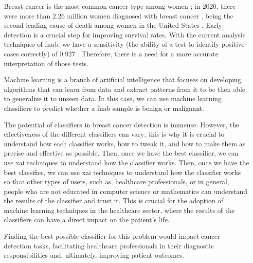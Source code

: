 
Breast cancer is the most common cancer type among women \cite{wcrf_international_breast_nodate}; in 2020, there were more than 2.26 million women diagnosed with breast cancer \cite{wcrf_international_breast_nodate}, being the second leading cause of death among women in the United States \cite{american_cancer_society_breast_nodate}. Early detection is a crucial step for improving survival rates. With the current analysis techniques of \ac{fnab},
we have a sensitivity (the ability of a test to identify positive cases correctly) of 0.927 \cite{yu_diagnostic_2012}. Therefore, there is a need for a more accurate interpretation of those tests.

Machine learning is a branch of artificial intelligence that focuses on developing algorithms that can learn from data and extract patterns from it to be then able to generalize it to unseen data. In this case, we can use machine learning classifiers to predict whether a \ac{fnab} sample is benign or malignant.

The potential of classifiers in breast cancer detection is immense. However, the effectiveness of the different classifiers can vary; this is why it is crucial to understand how each classifier works, how to tweak it, and how to make them as precise and effective as possible. Then, once we have the best classifier, we can use \ac{xai} techniques to understand how the classifier works. Then, once we have the best classifier, we can use \ac{xai} techniques to understand how the classifier works so that other types of users, such as, healthcare professionals, or in general, people who are not educated in computer science or mathematics can understand the results of the classifier and trust it. This is crucial for the adoption of machine learning techniques in the healthcare sector, where the results of the classifiers can have a direct impact on the patient's life.

Finding the best possible classifier for this problem would impact cancer detection tasks, facilitating healthcare professionals in their diagnostic responsibilities and, ultimately, improving patient outcomes.
